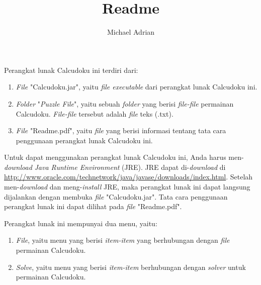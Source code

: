 \documentclass[11pt,a4paper,twoside,openright]{article}
\title{Readme}
\author{Michael Adrian}
\date{}
\begin{document}
\maketitle

Perangkat lunak Calcudoku ini terdiri dari:
\begin{enumerate}
\item \textit{File} "Calcudoku.jar", yaitu \textit{file executable} dari perangkat lunak Calcudoku ini.
\item \textit{Folder} "\textit{Puzzle File}", yaitu sebuah \textit{folder} yang berisi \textit{file-file} permainan Calcudoku. \textit{File-file} tersebut adalah \textit{file} teks (.txt).
\item \textit{File} "Readme.pdf", yaitu \textit{file} yang berisi informasi tentang tata cara penggunaan perangkat lunak Calcudoku ini.
\end{enumerate}

Untuk dapat menggunakan perangkat lunak Calcudoku ini, Anda harus men-\textit{download} \textit{Java Runtime Environment} (JRE). JRE dapat di-\textit{download} di \url{http://www.oracle.com/technetwork/java/javase/downloads/index.html}. Setelah men-\textit{download} dan meng-\textit{install} JRE, maka perangkat lunak ini dapat langsung dijalankan dengan membuka \textit{file} "Calcudoku.jar". Tata cara penggunaan perangkat lunak ini dapat dilihat pada \textit{file} "Readme.pdf".

Perangkat lunak ini mempunyai dua menu, yaitu:
\begin{enumerate}
\item \textit{File}, yaitu menu yang berisi \textit{item-item} yang berhubungan dengan \textit{file} permainan Calcudoku.
\item \textit{Solve}, yaitu menu yang berisi \textit{item-item} berhubungan dengan \textit{solver} untuk permainan Calcudoku.
\end{enumerate}
\end{document}
